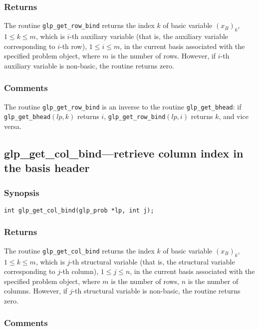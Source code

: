 \subsubsection*{Returns}

The routine \verb|glp_get_row_bind| returns the index $k$ of basic
variable $(x_B)_k$, $1\leq k\leq m$, which is $i$-th auxiliary variable
(that is, the auxiliary variable corresponding to $i$-th row),
$1\leq i\leq m$, in the current basis associated with the specified
problem object, where $m$ is the number of rows. However, if $i$-th
auxiliary variable is non-basic, the routine returns zero.

\subsubsection*{Comments}

The routine \verb|glp_get_row_bind| is an inverse to the routine
\verb|glp_get_bhead|: if \verb|glp_get_bhead|$(lp,k)$ returns $i$,
\verb|glp_get_row_bind|$(lp,i)$ returns $k$, and vice versa.

\subsection{glp\_get\_col\_bind---retrieve column index in the basis
header}

\subsubsection*{Synopsis}

\begin{verbatim}
int glp_get_col_bind(glp_prob *lp, int j);
\end{verbatim}

\subsubsection*{Returns}

The routine \verb|glp_get_col_bind| returns the index $k$ of basic
variable $(x_B)_k$, $1\leq k\leq m$, which is $j$-th structural
variable (that is, the structural variable corresponding to $j$-th
column), $1\leq j\leq n$, in the current basis associated with the
specified problem object, where $m$ is the number of rows, $n$ is the
number of columns. However, if $j$-th structural variable is non-basic,
the routine returns zero.

\subsubsection*{Comments}

